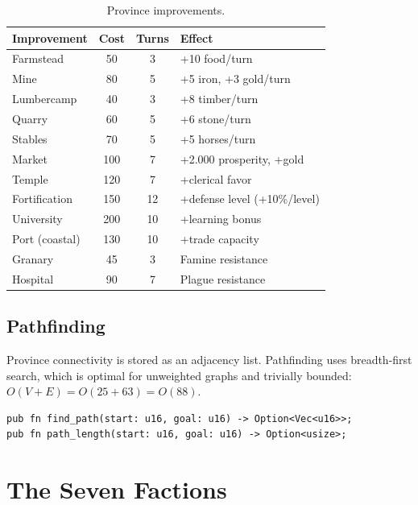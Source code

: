 \documentclass[a4paper, 11pt]{article}
\begin{document}
\begin{table}[htbp]
\centering
\caption{Province improvements.}
\label{tab:improvements}
\begin{tabular}{@{}lccl@{}}
\toprule
\textbf{Improvement} & \textbf{Cost} & \textbf{Turns} & \textbf{Effect} \\
\midrule
Farmstead       & 50  & 3  & +10 food/turn \\
Mine            & 80  & 5  & +5 iron, +3 gold/turn \\
Lumbercamp      & 40  & 3  & +8 timber/turn \\
Quarry          & 60  & 5  & +6 stone/turn \\
Stables         & 70  & 5  & +5 horses/turn \\
Market          & 100 & 7  & +2.000 prosperity, +gold \\
Temple          & 120 & 7  & +clerical favor \\
Fortification   & 150 & 12 & +defense level (+10\%/level) \\
University      & 200 & 10 & +learning bonus \\
Port (coastal)  & 130 & 10 & +trade capacity \\
Granary         & 45  & 3  & Famine resistance \\
Hospital        & 90  & 7  & Plague resistance \\
\bottomrule
\end{tabular}
\end{table}

\subsection{Pathfinding}

Province connectivity is stored as an adjacency list. Pathfinding uses
breadth-first search, which is optimal for unweighted graphs and trivially
bounded: $O(V + E) = O(25 + 63) = O(88)$.

\begin{lstlisting}[caption={BFS pathfinding API.}]
pub fn find_path(start: u16, goal: u16) -> Option<Vec<u16>>;
pub fn path_length(start: u16, goal: u16) -> Option<usize>;
\end{lstlisting}


\section{The Seven Factions}
\label{sec:factions}
\end{document}
